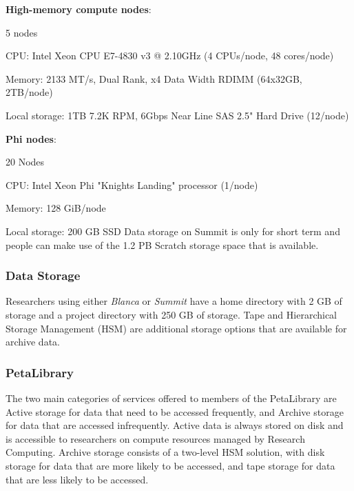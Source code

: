 \noindent
\textbf{High-memory compute nodes}:
\begin{compactitem}
\item 5 nodes
\item CPU: Intel Xeon CPU E7-4830 v3 @ 2.10GHz (4 CPUs/node, 48 cores/node)
\item Memory: 2133 MT/s, Dual Rank, x4 Data Width RDIMM (64x32GB, 2TB/node)
\item Local storage: 1TB 7.2K RPM, 6Gbps Near Line SAS 2.5" Hard Drive (12/node)
\end{compactitem}

\noindent
\textbf{Phi nodes}:
\begin{compactitem}
\item 20 Nodes
\item CPU: Intel Xeon Phi "Knights Landing" processor (1/node)
\item Memory: 128 GiB/node
\item Local storage: 200 GB SSD
Data storage on Summit is only for short term and people can make use of the 1.2 PB Scratch storage space that is available.
\end{compactitem}

\subsubsection*{Data Storage}

Researchers using either \textit{Blanca} or \textit{Summit} have a home directory with 2 GB of storage and a project directory with 250 GB of storage.
Tape and Hierarchical Storage Management (HSM) are additional storage options that are available for archive data.

\subsubsection*{PetaLibrary}

The two main categories of services offered to members of the PetaLibrary are Active storage for data that need to be accessed frequently, and Archive storage for data that are accessed infrequently. Active data is always stored on disk and is accessible to researchers on compute resources managed by Research Computing. Archive storage consists of a two-level HSM solution, with disk storage for data that are more likely to be accessed, and tape storage for data that are less likely to be accessed.

